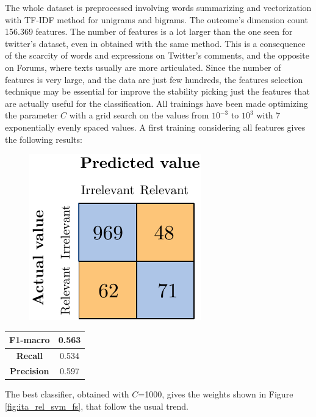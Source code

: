 The whole dataset is preprocessed involving words summarizing and vectorization with TF-IDF method for unigrams and bigrams. The outcome's dimension count 156.369 features. The number of features is a lot larger than the one seen for twitter's dataset, even in obtained with the same method. This is a consequence of the scarcity of words and expressions on Twitter's comments, and the opposite on Forums, where texts usually are more articulated. Since the number of features is very large, and the data are just few hundreds, the features selection technique may be essential for improve the stability picking just the features that are actually useful for the classification. All trainings have been made optimizing the parameter $C$ with a grid search on the values from $10^{-3}$ to $10^3$ with 7 exponentially evenly spaced values. A first training considering all features gives the following results:

\begin{figure}[H]
	\centering
	\includegraphics[scale=1]{figures/conf_matrices/ita_rel_svm/ita_rel_svm_bfs.pdf}
	\label{fig:ita_rel_svm_bfs}
\end{figure}

\begin{center}
	\begin{tabular}{ | c | c | } 
		\hline
		\textbf{F1-macro} & 0.563 \\
		\hline
		\textbf{Recall} & 0.534 \\ 
		\hline
		\textbf{Precision} & 0.597 \\ 
		\hline
	\end{tabular}
\end{center}

The best classifier, obtained with $C$=1000, gives the weights shown in Figure \ref{fig:ita_rel_svm_fs}, that follow the usual trend.

